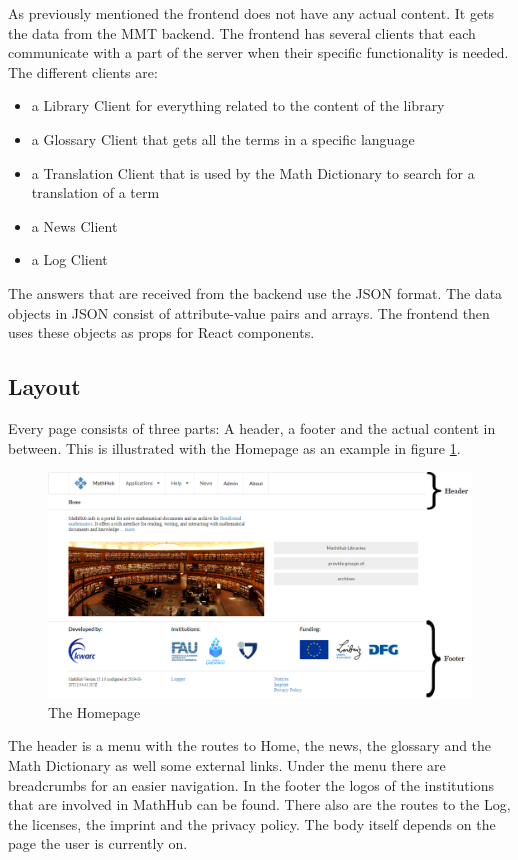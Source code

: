 \documentclass[11pt,a4paper]{article}
\begin{document}
As previously mentioned the frontend does not have any actual content.
It gets the data from the MMT backend.
The frontend has several clients that each communicate with a part of the server when their specific functionality is needed.
The different clients are:
\begin{itemize}
\item a Library Client for everything related to the content of the library
\item a Glossary Client that gets all the terms in a specific language
\item a Translation Client that is used by the Math Dictionary to search for a translation of a term 
\item a News Client
\item a Log Client
\end{itemize}

The answers that are received from the backend use the JSON format.
The data objects in JSON consist of attribute-value pairs and arrays.
The frontend then uses these objects as props for React components.

\subsection{Layout}
Every page consists of three parts: A header, a footer and the actual content in between.
This is illustrated with the Homepage as an example in figure \ref{fig:home}.

\begin{figure}[H]
\includegraphics[width=1\textwidth]{home2.png}
\caption{The Homepage}
\label{fig:home}
\end{figure}

The header is a menu with the routes to Home, the news, the glossary and the Math Dictionary as well some external links.
Under the menu there are breadcrumbs for an easier navigation.
In the footer the logos of the institutions that are involved in MathHub can be found.
There also are the routes to the Log, the licenses, the imprint and the privacy policy.
The body itself depends on the page the user is currently on.
\end{document}
